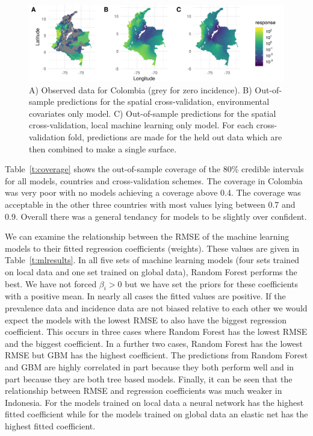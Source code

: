 \documentclass[review]{elsarticle}
\begin{document}
\begin{figure}[t!]
\centering
\includegraphics[width = 1\textwidth]{figs/col_comparison_map.png} %
\caption{
  A) Observed data for Colombia (grey for zero incidence). B) Out-of-sample predictions for the spatial cross-validation, environmental covariates only model. C) Out-of-sample predictions for the spatial cross-validation, local machine learning only model. For each cross-validation fold, predictions are made for the held out data which are then combined to make a single surface.
}
\label{f:map}
\end{figure}

Table~\ref{t:coverage} shows the out-of-sample coverage of the 80\% credible intervals for all models, countries and cross-validation schemes.
The coverage in Colombia was very poor with no models achieving a coverage above 0.4.
The coverage was acceptable in the other three countries with most values lying between 0.7 and 0.9.
Overall there was a general tendancy for models to be slightly over confident.

We can examine the relationship between the RMSE of the machine learning models to their fitted regression coefficients (weights).
These values are given in Table~\ref{t:mlresults}.
In all five sets of machine learning models (four sets trained on local data and one set trained on global data), Random Forest performs the best.
We have not forced $\beta_i > 0$ but we have set the priors for these coefficients with a positive mean.
In nearly all cases the fitted values are positive.
If the prevalence data and incidence data are not biased relative to each other we would expect the models with the lowest RMSE to also have the biggest regression coefficient.
This occurs in three cases where Random Forest has the lowest RMSE and the biggest coefficient.
In a further two cases, Random Forest has the lowest RMSE but GBM has the highest coefficient.
The predictions from Random Forest and GBM are highly correlated in part because they both perform well and in part because they are both tree based models.
Finally, it can be seen that the relationship between RMSE and regression coefficients was much weaker in Indonesia.
For the models trained on local data a neural network has the highest fitted coefficient while for the models trained on global data an elastic net has the highest fitted coefficient.
\end{document}
